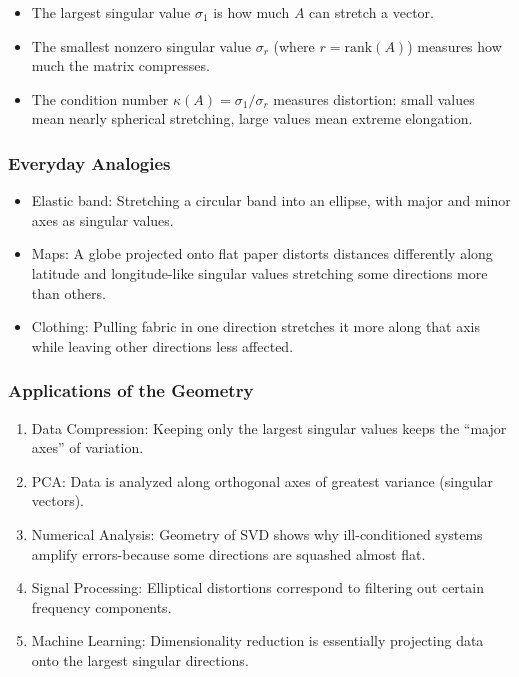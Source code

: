 \documentclass[
  letterpaper,
  DIV=11,
  numbers=noendperiod]{scrreprt}
\providecommand{\tightlist}{%
  \setlength{\itemsep}{0pt}\setlength{\parskip}{0pt}}
\begin{document}
\begin{itemize}
\tightlist
\item
  The largest singular value \(\sigma_1\) is how much \(A\) can stretch
  a vector.
\item
  The smallest nonzero singular value \(\sigma_r\) (where
  \(r = \text{rank}(A)\)) measures how much the matrix compresses.
\item
  The condition number \(\kappa(A) = \sigma_1 / \sigma_r\) measures
  distortion: small values mean nearly spherical stretching, large
  values mean extreme elongation.
\end{itemize}

\subsubsection{Everyday Analogies}\label{everyday-analogies-78}

\begin{itemize}
\tightlist
\item
  Elastic band: Stretching a circular band into an ellipse, with major
  and minor axes as singular values.
\item
  Maps: A globe projected onto flat paper distorts distances differently
  along latitude and longitude-like singular values stretching some
  directions more than others.
\item
  Clothing: Pulling fabric in one direction stretches it more along that
  axis while leaving other directions less affected.
\end{itemize}

\subsubsection{Applications of the
Geometry}\label{applications-of-the-geometry}

\begin{enumerate}
\def\labelenumi{\arabic{enumi}.}
\tightlist
\item
  Data Compression: Keeping only the largest singular values keeps the
  ``major axes'' of variation.
\item
  PCA: Data is analyzed along orthogonal axes of greatest variance
  (singular vectors).
\item
  Numerical Analysis: Geometry of SVD shows why ill-conditioned systems
  amplify errors-because some directions are squashed almost flat.
\item
  Signal Processing: Elliptical distortions correspond to filtering out
  certain frequency components.
\item
  Machine Learning: Dimensionality reduction is essentially projecting
  data onto the largest singular directions.
\end{enumerate}
\end{document}
